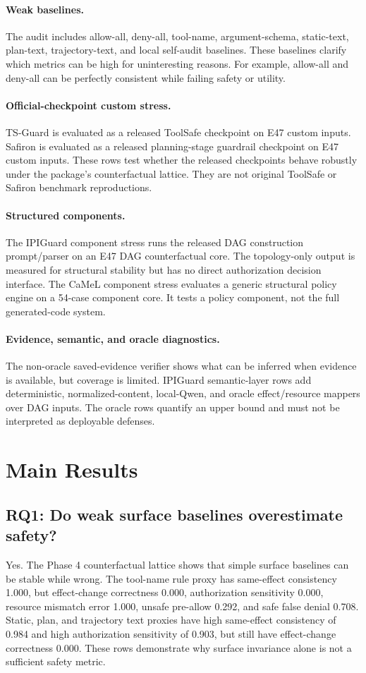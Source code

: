 \documentclass[11pt]{article}
\begin{document}
\paragraph{Weak baselines.}
The audit includes allow-all, deny-all, tool-name, argument-schema, static-text, plan-text, trajectory-text, and local self-audit baselines. These baselines clarify which metrics can be high for uninteresting reasons. For example, allow-all and deny-all can be perfectly consistent while failing safety or utility.

\paragraph{Official-checkpoint custom stress.}
TS-Guard is evaluated as a released ToolSafe checkpoint on E47 custom inputs. Safiron is evaluated as a released planning-stage guardrail checkpoint on E47 custom inputs. These rows test whether the released checkpoints behave robustly under the package's counterfactual lattice. They are not original ToolSafe or Safiron benchmark reproductions.

\paragraph{Structured components.}
The IPIGuard component stress runs the released DAG construction prompt/parser on an E47 DAG counterfactual core. The topology-only output is measured for structural stability but has no direct authorization decision interface. The CaMeL component stress evaluates a generic structural policy engine on a 54-case component core. It tests a policy component, not the full generated-code system.

\paragraph{Evidence, semantic, and oracle diagnostics.}
The non-oracle saved-evidence verifier shows what can be inferred when evidence is available, but coverage is limited. IPIGuard semantic-layer rows add deterministic, normalized-content, local-Qwen, and oracle effect/resource mappers over DAG inputs. The oracle rows quantify an upper bound and must not be interpreted as deployable defenses.

\section{Main Results}
\subsection{RQ1: Do weak surface baselines overestimate safety?}
Yes. The Phase 4 counterfactual lattice shows that simple surface baselines can be stable while wrong. The tool-name rule proxy has same-effect consistency 1.000, but effect-change correctness 0.000, authorization sensitivity 0.000, resource mismatch error 1.000, unsafe pre-allow 0.292, and safe false denial 0.708. Static, plan, and trajectory text proxies have high same-effect consistency of 0.984 and high authorization sensitivity of 0.903, but still have effect-change correctness 0.000. These rows demonstrate why surface invariance alone is not a sufficient safety metric.
\end{document}
